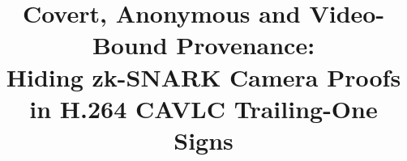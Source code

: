 \documentclass[conference,10pt]{IEEEtran}
\theoremstyle{remark}
\begin{document}
\title{Covert, Anonymous and Video-Bound Provenance:\\
Hiding zk-SNARK Camera Proofs in H.264 CAVLC Trailing-One Signs}

\author{
}

\maketitle

















\appendices

\end{document}
